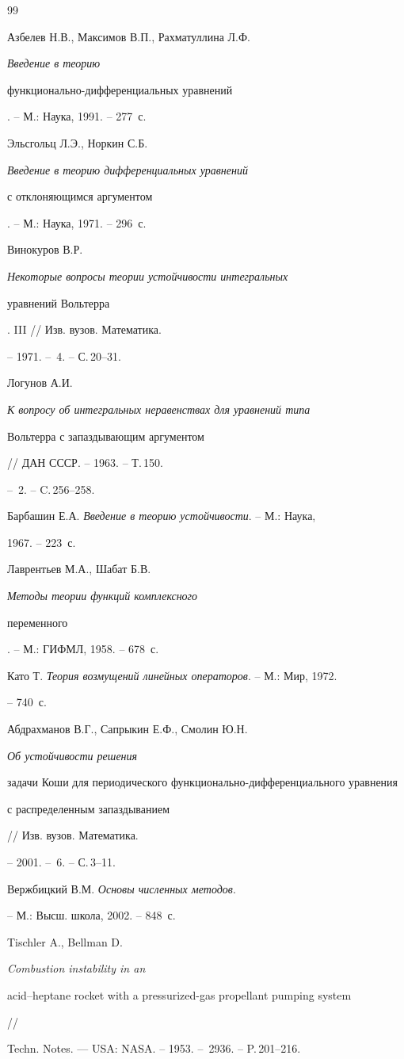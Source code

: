 \begin{thebibliography}{99}







Азбелев Н.В., Максимов В.П., Рахматуллина Л.Ф. {\em Введение в теорию


функционально-дифференциальных уравнений}. -- М.: Наука, 1991. -- 277~с.




Эльсгольц Л.Э., Норкин С.Б. {\em Введение в теорию дифференциальных уравнений


с отклоняющимся аргументом}. -- М.: Наука, 1971. -- 296~с.




Винокуров В.Р. {\em Некоторые вопросы теории устойчивости интегральных


уравнений Вольтерра}. III // Изв. вузов. Математика.


-- 1971. -- \No\,4. -- С.\,20--31.




Логунов А.И. {\em К вопросу об интегральных неравенствах для уравнений типа


Вольтерра с запаздывающим аргументом} // ДАН СССР. -- 1963. -- Т.\,150.


-- \No\,2. -- C.\,256--258.




Барбашин Е.А.  {\em Введение в теорию устойчивости}. -- М.: Наука,


1967. -- 223~с.




Лаврентьев М.А., Шабат Б.В. {\em Методы теории функций комплексного 


переменного}. -- М.: ГИФМЛ, 1958. -- 678~с.




Като Т. {\em Теория возмущений линейных операторов}. -- М.: Мир, 1972.


-- 740~с.




Абдрахманов В.Г., Сапрыкин Е.Ф., Смолин Ю.Н. {\em Об устойчивости решения


задачи Коши для периодического функционально-дифференциального уравнения


с распределенным запаздыванием} // Изв. вузов. Математика.


-- 2001. -- \No\,6. -- С.\,3--11.




Вержбицкий В.М. {\em Основы численных методов}.


-- М.: Высш. школа, 2002. -- 848~с.




Tischler A., Bellman D. {\em Combustion instability in an


acid--heptane rocket with a pressurized-gas propellant pumping system} //


Techn. Notes. --- USA: NASA. -- 1953. -- \No\,2936. -- P.\,201--216.





\end{thebibliography}
